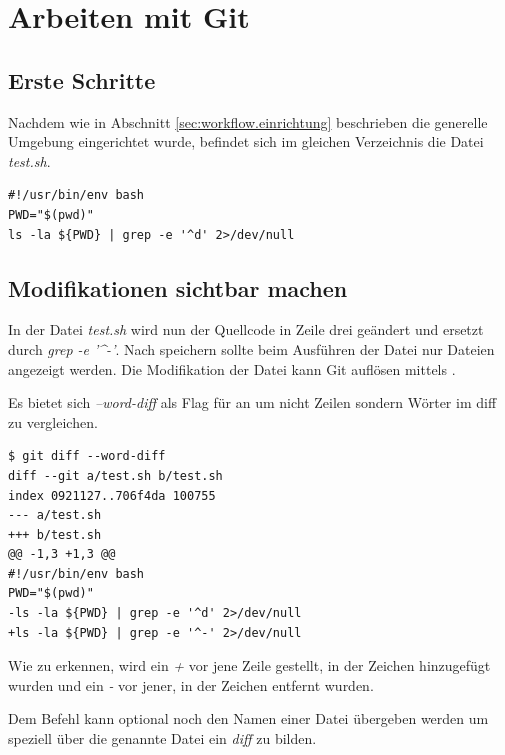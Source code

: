 \section{Arbeiten mit Git}
\label{sec:work-with-git}

\subsection{Erste Schritte}
\label{sec:work-with-git.first-steps}
Nachdem wie in Abschnitt \ref{sec:workflow.einrichtung} beschrieben die generelle Umgebung eingerichtet wurde, befindet sich im gleichen Verzeichnis die Datei \textit{test.sh}.

\begin{verbatim}
#!/usr/bin/env bash
PWD="$(pwd)"
ls -la ${PWD} | grep -e '^d' 2>/dev/null
\end{verbatim}

\subsection{Modifikationen sichtbar machen}
\label{sec:work-with-git.modifikation}
In der Datei \textit{test.sh} wird nun der Quellcode in Zeile drei geändert und ersetzt durch \textit{ grep -e '\^{}-'}. Nach speichern sollte beim Ausführen der Datei nur Dateien angezeigt werden. Die Modifikation der Datei kann Git auflösen mittels \textit{}.

\begin{info-popup}
  Es bietet sich \textit{--word-diff} als Flag für \textit{} an um nicht Zeilen sondern Wörter im diff zu vergleichen.
\end{info-popup}

\begin{verbatim}
$ git diff --word-diff
diff --git a/test.sh b/test.sh
index 0921127..706f4da 100755
--- a/test.sh
+++ b/test.sh
@@ -1,3 +1,3 @@
#!/usr/bin/env bash
PWD="$(pwd)"
-ls -la ${PWD} | grep -e '^d' 2>/dev/null
+ls -la ${PWD} | grep -e '^-' 2>/dev/null
\end{verbatim}

Wie zu erkennen, wird ein \textit{+} vor jene Zeile gestellt, in der Zeichen hinzugefügt wurden und ein \textit{-} vor jener, in der Zeichen entfernt wurden.

Dem Befehl \textit{} kann optional noch den Namen einer Datei übergeben werden um speziell über die genannte Datei ein \textit{diff} zu bilden.

